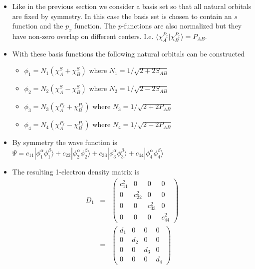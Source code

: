 \documentclass{amsart}
\begin{document}
\begin{itemize}
\item Like in the previous section we consider a basis set so that all natural orbitals are fixed by
         symmetry. In this case the basis set is chosen to contain an $s$ function and the $p_x$ function.
         The $p$-functions are also normalized but they have non-zero overlap on different centers. I.e. 
         $\langle \chi_A^{P_x}|\chi_B^{P_x}\rangle = P_{AB}$. 
\item With these basis functions the following natural orbitals can be constructed
         \begin{itemize}
         \item $\phi_1 = N_1 \left(\chi_A^S + \chi_B^S\right)$ where $N_1 = 1/\sqrt{2+2S_{AB}}$
         \item $\phi_2 = N_2 \left(\chi_A^S - \chi_B^S\right)$ where $N_2 = 1/\sqrt{2-2S_{AB}}$
         \item $\phi_3 = N_3 \left(\chi_A^{P_x} + \chi_B^{P_x}\right)$ where $N_3 = 1/\sqrt{2+2P_{AB}}$
         \item $\phi_4 = N_4 \left(\chi_A^{P_x} - \chi_B^{P_x}\right)$ where $N_4 = 1/\sqrt{2-2P_{AB}}$
         \end{itemize}
\item By symmetry the wave function is 
         $\Psi = c_{11}|\phi_1^\alpha\phi_1^\beta\rangle + c_{22}|\phi_2^\alpha\phi_2^\beta\rangle + c_{33}|\phi_3^\alpha\phi_3^\beta\rangle + c_{44}|\phi_4^\alpha\phi_4^\beta\rangle $
\item The resulting 1-electron density matrix is
         \begin{eqnarray}
         D_{1} &=&
         \left(\begin{matrix}
         c_{11}^2 & 0 & 0 & 0 \\
         0 & c_{22}^2 & 0 & 0 \\
         0 & 0 & c_{33}^2 & 0 \\
         0 & 0 & 0 & c_{44}^2
         \end{matrix}\right) \\
         &=&
         \left(\begin{matrix}
         d_{1} & 0 & 0 & 0 \\
         0 & d_{2} & 0 & 0 \\
         0 & 0 & d_{3} & 0 \\
         0 & 0 & 0 & d_{4} 
         \end{matrix}\right)
         \end{eqnarray}

\end{itemize}
\end{document}
